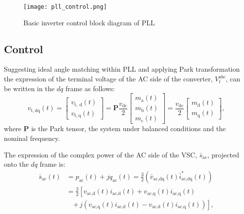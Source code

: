 \begin{figure}[htbp]
    \centering
    \texttt{[image: pll\_control.png]}
    \caption{Basic inverter control block diagram of PLL \autocite{6739414}}
    \label{fig:pll_control}
\end{figure}

\subsection{Control}\label{subsec:ch3/sec2/sub4}
Suggesting ideal angle matching within PLL and applying Park transformation the expression of the terminal voltage of the AC side of the converter, $V_{t}^{abc}$, can be written in the $dq$ frame as follows:
\begin{equation}
    v_{\mathrm{t}, \mathrm{dq}}(t)=\left[\begin{array}{c}
v_{\mathrm{t}, \mathrm{~d}}(t) \\
v_{\mathrm{t}, \mathrm{q}}(t)
\end{array}\right]=\mathbf{P} \frac{v_{\mathrm{dc}}}{2}\left[\begin{array}{c}
m_{\mathrm{a}}(t) \\
m_{\mathrm{b}}(t) \\
m_{\mathrm{c}}(t)
\end{array}\right]=\frac{v_{\mathrm{dc}}}{2}\left[\begin{array}{c}
m_{\mathrm{d}}(t) \\
m_{\mathrm{q}}(t)
\end{array}\right],
\label{eq:v_dq_transf}
\end{equation}
where $\mathbf{P}$ is the Park tensor, the system under balanced conditions and the nominal frequency.

The expression of the complex power of the AC side of the VSC, $\bar{s}_{\mathrm{ac}}$, projected onto the $dq$ frame is:
\begin{equation}
    \begin{aligned}
        \bar{s}_{\text{ac}}(t) &= p_{\text{ac}}(t) + j q_{\text{ac}}(t) = \frac{3}{2} \left( \bar{v}_{\text{ac,dq}}(t) \bar{i}_{\text{ac,dq}}^*(t) \right) \\
        &= \frac{3}{2} \left[ v_{\text{ac,d}}(t) i_{\text{ac,d}}(t) + v_{\text{ac,q}}(t) i_{\text{ac,q}}(t) \right. \\
        &\quad \left. +\, j \left( v_{\text{ac,q}}(t) i_{\text{ac,d}}(t) - v_{\text{ac,d}}(t) i_{\text{ac,q}}(t) \right) \right],
    \end{aligned}
\end{equation}

